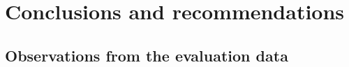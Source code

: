\documentclass[smallcondensed]{svjour3}
\begin{document}
%
%
%

\section{Conclusions and recommendations}
\label{Conclusions}

\subsection{Observations from the evaluation data}
\end{document}

